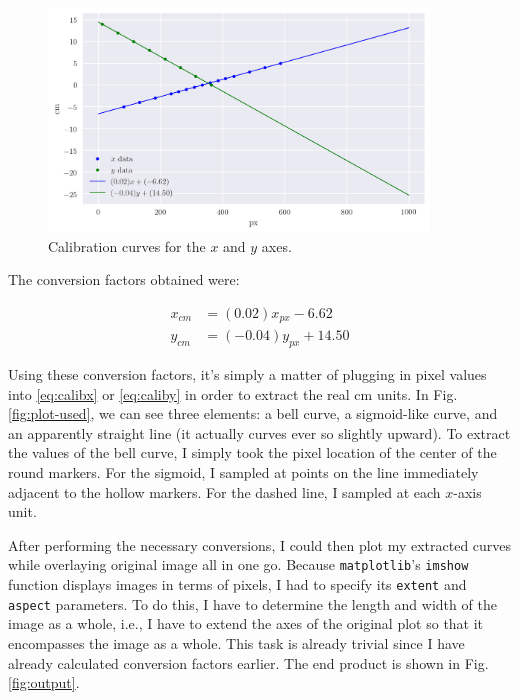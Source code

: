 \documentclass[12pt,a4paper]{article}
\begin{document}
\begin{figure}[!htb]
	\centering
	\includegraphics[width=0.9\textwidth]{calibration_curves.png}
	\caption{Calibration curves for the $x$ and $y$ axes.}	
	\label{fig:calib}
\end{figure}

The conversion factors obtained were:

\begin{align}
	x_{cm} &= (0.02)x_{px} - 6.62 \label{eq:calibx} \\
	y_{cm} &= (-0.04)y_{px} + 14.50 \label{eq:caliby}
\end{align}

Using these conversion factors, it's simply a matter of plugging in pixel values into \eqref{eq:calibx} or \eqref{eq:caliby} in order to extract the real cm units. In Fig. \ref{fig:plot-used}, we can see three elements: a bell curve, a sigmoid-like curve, and an apparently straight line (it actually curves ever so slightly upward). To extract the values of the bell curve, I simply took the pixel location of the center of the round markers. For the sigmoid, I sampled at points on the line immediately adjacent to the hollow markers. For the dashed line, I sampled at each $x$-axis unit.

After performing the necessary conversions, I could then plot my extracted curves while overlaying original image all in one go. Because \texttt{matplotlib}'s \texttt{imshow} function displays images in terms of pixels, I had to specify its \texttt{extent} and \texttt{aspect} parameters. To do this, I have to determine the length and width of the image as a whole, i.e., I have to extend the axes of the original plot so that it encompasses the image as a whole. This task is already trivial since I have already calculated conversion factors earlier. The end product is shown in Fig. \ref{fig:output}.
\end{document}
